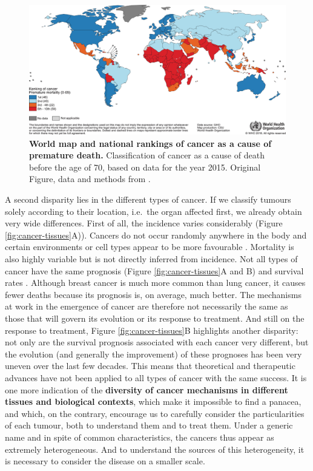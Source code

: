 \documentclass[a4paper,12pt,twoside,onecolumn,openright,final,oldfontcommands]{memoir}
\begin{document}
\begin{figure}

{\centering \includegraphics[width=0.9\linewidth]{fig/globocan-map} 

}

\caption[World map and national rankings of cancer as a cause of premature death]{\textbf{World map and national rankings of
cancer as a cause of premature death.} Classification of cancer as a
cause of death before the age of 70, based on data for the year 2015.
Original Figure, data and methods from \citet{bray2018global}.}\label{fig:globocan-map}
\end{figure}






A second disparity lies in the different types of cancer. If we classify
tumours solely according to their location, i.e.~the organ affected
first, we already obtain very wide differences. First of all, the
incidence varies considerably (Figure \ref{fig:cancer-tissues}A)).
Cancers do not occur randomly anywhere in the body and certain
environments or cell types appear to be more favourable
\citep{tomasetti2015variation}. Mortality is also highly variable but is
not directly inferred from incidence. Not all types of cancer have the
same prognosis (Figure \ref{fig:cancer-tissues}A and B) and survival
rates \citep{liu2018integrated}. Although breast cancer is much more
common than lung cancer, it causes fewer deaths because its prognosis
is, on average, much better. The mechanisms at work in the emergence of
cancer are therefore not necessarily the same as those that will govern
its evolution or its response to treatment. And still on the response to
treatment, Figure \ref{fig:cancer-tissues}B highlights another
disparity: not only are the survival prognosis associated with each
cancer very different, but the evolution (and generally the improvement)
of these prognoses has been very uneven over the last few decades. This
means that theoretical and therapeutic advances have not been applied to
all types of cancer with the same success. It is one more indication of
the \textbf{diversity of cancer mechanisms in different tissues and
biological contexts}, which make it impossible to find a panacea, and
which, on the contrary, encourage us to carefully consider the
particularities of each tumour, both to understand them and to treat
them. Under a generic name and in spite of common characteristics, the
cancers thus appear as extremely heterogeneous. And to understand the
sources of this heterogeneity, it is necessary to consider the disease
on a smaller scale.
\end{document}

